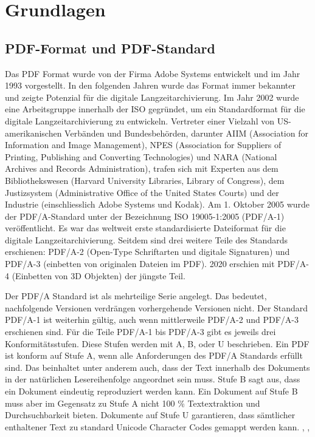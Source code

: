 \documentclass[a4paper,oneside, 12pt]{report}
\begin{document}
\chapter{Grundlagen}\label{sec:grundlagen}
\section{PDF-Format und PDF-Standard}
Das PDF Format wurde von der Firma Adobe Systems entwickelt und im Jahr 1993 vorgestellt. In den folgenden Jahren wurde das Format immer bekannter und zeigte Potenzial für die digitale Langzeitarchivierung. Im Jahr 2002 wurde eine Arbeitsgruppe innerhalb der \ac{ISO} gegründet, um ein Standardformat für die digitale Langzeitarchivierung zu entwickeln. Vertreter einer Vielzahl von US-amerikanischen Verbänden und Bundesbehörden, darunter AIIM (Association for Information and Image Management), NPES (Association for Suppliers of Printing, Publishing and Converting Technologies) und NARA (National Archives and Records Administration), trafen sich mit Experten aus dem Bibliothekswesen (Harvard University Libraries, Library of Congress), dem Justizsystem (Administrative Office of the United States Courts) und der Industrie (einschliesslich Adobe Systems und Kodak). Am 1. Oktober 2005 wurde der PDF/A-Standard unter der Bezeichnung ISO 19005-1:2005 (PDF/A-1) veröffentlicht. Es war das weltweit erste standardisierte Dateiformat für die digitale Langzeitarchivierung. Seitdem sind drei weitere Teile des Standards erschienen: PDF/A-2 (Open-Type Schriftarten und digitale Signaturen) und PDF/A-3 (einbetten von originalen Dateien im PDF). 2020 erschien mit PDF/A-4 (Einbetten von 3D Objekten) der jüngste Teil. \cite{pdfhist}

Der PDF/A Standard ist als mehrteilige Serie angelegt. Das bedeutet, nachfolgende Versionen verdrängen vorhergehende Versionen nicht. Der Standard PDF/A-1 ist weiterhin gültig, auch wenn mittlerweile PDF/A-2 und PDF/A-3 erschienen sind. Für die Teile PDF/A-1 bis PDF/A-3 gibt es jeweils drei Konformitätsstufen. Diese Stufen werden mit A, B, oder U beschrieben. Ein PDF ist konform auf Stufe A, wenn alle Anforderungen des PDF/A Standards erfüllt sind. Das beinhaltet unter anderem auch, dass der Text innerhalb des Dokuments in der natürlichen Lesereihenfolge angeordnet sein muss. Stufe B sagt aus, dass ein Dokument eindeutig reproduziert werden kann. Ein Dokument auf Stufe B muss aber im Gegensatz zu Stufe A nicht 100 \% Textextraktion und Durchsuchbarkeit bieten. Dokumente auf Stufe U garantieren, dass sämtlicher enthaltener Text zu standard Unicode Character Codes gemappt werden kann. \cite{pdfhist}, \cite{pdftools}, \cite{adobepdf}
\end{document}
